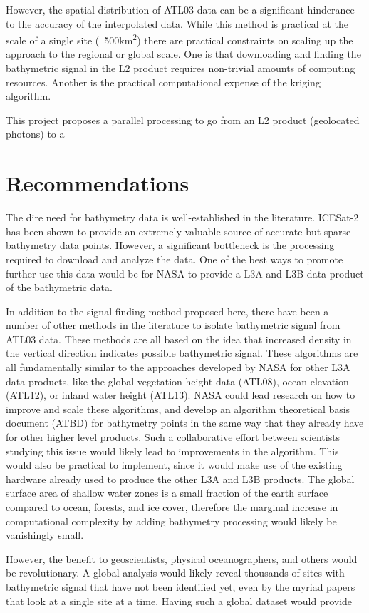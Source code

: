 However, the spatial distribution of ATL03 data can be a significant hinderance to the accuracy of the interpolated data. While this method is practical at the scale of a single site (~500\si{km^2}) there are practical constraints on scaling up the approach to the regional or global scale. One is that downloading and finding the bathymetric signal in the L2 product requires non-trivial amounts of computing resources. Another is the practical computational expense of the kriging algorithm.



This project proposes a parallel processing to go from an L2 product (geolocated photons) to a 

\section{Recommendations}

The dire need for bathymetry data is well-established in the literature. ICESat-2 has been shown to provide an extremely valuable source of accurate but sparse bathymetry data points. However, a significant bottleneck is the processing required to download and analyze the data. One of the best ways to promote further use this data would be for NASA to provide a L3A and L3B data product of the bathymetric data. 

In addition to the signal finding method proposed here, there have been a number of other methods in the literature to isolate bathymetric signal from ATL03 data. These methods are all based on the idea that increased density in the vertical direction indicates possible bathymetric signal. These algorithms are all fundamentally similar to the approaches developed by NASA for other L3A data products, like the global vegetation height data (ATL08), ocean elevation (ATL12), or inland water height (ATL13). NASA could lead research on how to improve and scale these algorithms, and develop an algorithm theoretical basis document (ATBD) for bathymetry points in the same way that they already have for other higher level products. Such a collaborative effort between scientists studying this issue would likely lead to improvements in the algorithm. This would also be practical to implement, since it would make use of the existing hardware already used to produce the other L3A and L3B products. The global surface area of shallow water zones is a small fraction of the earth surface compared to ocean, forests, and ice cover, therefore the marginal increase in computational complexity by adding bathymetry processing would likely be vanishingly small. 

However, the benefit to geoscientists, physical oceanographers, and others would be revolutionary. A global analysis would likely reveal thousands of sites with bathymetric signal that have not been identified yet, even by the myriad papers that look at a single site at a time. Having such a global dataset would provide 